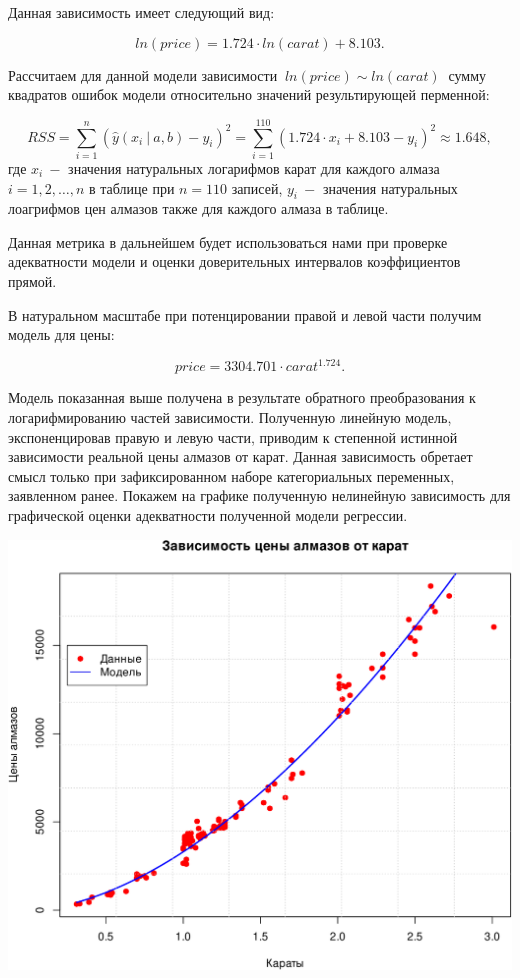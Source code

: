 \documentclass[
]{article}
\begin{document}
Данная зависимость имеет следующий вид:

\[
ln(price) = 1.724 \cdot ln(carat) + 8.103.
\]

Рассчитаем для данной модели зависимости
\(\ ln(price) \sim ln(carat)\ \) сумму квадратов ошибок модели
относительно значений результирующей перменной:

\[
RSS = \sum \limits_{i=1}^{n}\left( \hat{y}(x_i\ |\ a, b) - y_i \right)^2 = \sum \limits_{i=1}^{110}\left( 1.724 \cdot x_i + 8.103 - y_i \right)^2 \approx 1.648,
\] где \(x_i\ -\) значения натуральных логарифмов карат для каждого
алмаза \(i = 1, 2, \dots, n\) в таблице при \(n = 110\) записей,
\(y_i\ -\) значения натуральных лоагрифмов цен алмазов также для каждого
алмаза в таблице.

Данная метрика в дальнейшем будет использоваться нами при проверке
адекватности модели и оценки доверительных интервалов коэффициентов
прямой.

В натуральном масштабе при потенцировании правой и левой части получим
модель для цены:

\[
price = 3304.701 \cdot carat^{1.724}.
\]

Модель показанная выше получена в результате обратного преобразования к
логарифмированию частей зависимости. Полученную линейную модель,
экспоненцировав правую и левую части, приводим к степенной истинной
зависимости реальной цены алмазов от карат. Данная зависимость обретает
смысл только при зафиксированном наборе категориальных переменных,
заявленном ранее. Покажем на графике полученную нелинейную зависимость
для графической оценки адекватности полученной модели регрессии.

\begin{center}\includegraphics[width=0.6\linewidth]{Prac5_files/figure-latex/unnamed-chunk-15-1} \end{center}
\end{document}
